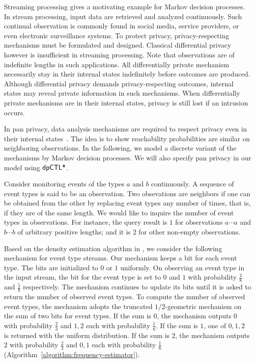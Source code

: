 
Streaming processing gives a motivating example for Markov
decision processes. In stream processing, input data are retrieved and
analyzed continuously. Such continual observation is commonly found
in social media, service providers, or even electronic surveillance
systems. To protect privacy, privacy-respecting mechanisms must be
formulated and designed. Classical differential privacy however is
insufficient in streaming processing. Note that observations are of
indefinite lengths in such applications. All differentially private
mechanism necessarily stay in their internal states indefinitely
before outcomes are produced. Although differential privacy demands
privacy-respecting outcomes, internal states may reveal private
information in such mechanisms. When differentially private mechanisms
are in their internal states, privacy is still lost if an intrusion
occurs.

In pan privacy, data analysis mechanisms are required to respect
privacy even in their internal states~\cite{DNPR:10:DPCO,DNPRY:10:PPSA}.
The idea is to show reachability probabilities are similar on
neighboring observations. In the following, we model a discrete
variant of the mechanisms by Markov decision processes. We will also
specify pan privacy in our model using $\textsf{dpCTL*}$.

Consider monitoring events of the types $a$ and $b$ continuously.
A sequence of event types is said to be an observation. Two
obsevations are {neighbors} if one can be obtained from the other
by replacing event types any number of times, that is, if they are of
the same length. %
We would like to inquire the number of event types in
observations. For instance, the query result is $1$
for observations $a \cdots a$ and $b \cdots b$ of arbitrary positive
lengths; and it is $2$ for other non-empty observations.

Based on the density estimation algorithm in \cite{DNPRY:10:PPSA}, we
consider the following mechanism for event type streams. Our mechanism
keeps a bit for each event type. The bits are initialized to $0$ or
$1$ uniformly. On observing an event type in the input stream, the
bit for the event type is set to $0$ and $1$ with probability
$\frac{3}{8}$ and $\frac{5}{8}$ respectively. The mechanism continues
to update its bits until it is asked to return the number of observed
event types. To compute the number of observed event types, the
mechanism adopts the truncated $1/2$-geometric mechanism on the sum of
two bits for event types. If the sum is $0$, the mechanism outputs $0$
with probability $\frac{2}{3}$ and $1, 2$ each with probability
$\frac{1}{6}$. If the sum is $1$, one of $0, 1, 2$ is returned with
the uniform distribution. If the sum is $2$, the mechanism outputs $2$
with probability $\frac{2}{3}$ and $0, 1$ each with probability
$\frac{1}{6}$ (Algorithm~\ref{algorithm:frequency-estimator}).

